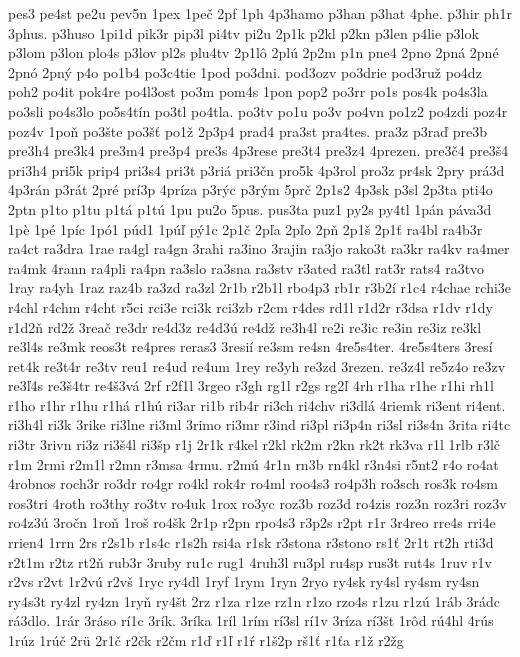 {pes3
pe4st
pe2u
pev5n
1pex
1peč
2pf
1ph
4p3hamo
p3han
p3hat
4phe.
p3hir
ph1r
3phus.
p3huso
1pi1d
pik3r
pip3l
pi4tv
pi2u
2p1k
p2kl
p2kn
p3len
p4lie
p3lok
p3lom
p3lon
plo4s
p3lov
pl2s
plu4tv
2p1lô
2plú
2p2m
p1n
pne4
2pno
2pná
2pné
2pnó
2pný
p4o
po1b4
po3c4tie
1pod
po3dni.
pod3ozv
po3drie
pod3ruž
po4dz
poh2
po4it
pok4re
po4l3ost
po3m
pom4s
1pon
pop2
po3rr
po1s
pos4k
po4s3la
po3sli
po4s3lo
po5s4tín
po3tl
po4tla.
po3tv
po1u
po3v
po4vn
po1z2
po4zdi
poz4r
poz4v
1poň
po3šte
po3šť
po1ž
2p3p4
prad4
pra3st
pra4tes.
pra3z
p3raď
pre3b
pre3h4
pre3k4
pre3m4
pre3p4
pre3s
4p3rese
pre3t4
pre3z4
4prezen.
pre3č4
pre3š4
pri3h4
pri5k
prip4
pri3s4
pri3t
p3riá
pri3čn
pro5k
4p3rol
pro3z
pr4sk
2pry
prá3d
4p3rán
p3rát
2pré
prí3p
4príza
p3rýc
p3rým
5prč
2p1s2
4p3sk
p3sl
2p3ta
pti4o
2ptn
p1to
p1tu
p1tá
p1tú
1pu
pu2o
5pus.
pus3ta
puz1
py2s
py4tl
1pán
páva3d
1pè
1pé
1píc
1pó1
púd1
1púľ
pý1c
2p1č
2pľa
2pľo
2pň
2p1š
2p1ť
ra4bl
ra4b3r
ra4ct
ra3dra
1rae
ra4gl
ra4gn
3rahi
ra3ino
3rajin
ra3jo
rako3t
ra3kr
ra4kv
ra4mer
ra4mk
4rann
ra4pli
ra4pn
ra3slo
ra3sna
ra3stv
r3ated
ra3tl
rat3r
rats4
ra3tvo
1ray
ra4yh
1raz
raz4b
ra3zd
ra3zl
2r1b
r2b1l
rbo4p3
rb1r
r3b2í
r1c4
r4chae
rchi3e
r4chl
r4chm
r4cht
r5ci
rci3e
rci3k
rci3zb
r2cm
r4des
rd1l
r1d2r
r3dsa
r1dv
r1dy
r1d2ň
rd2ž
3reač
re3dr
re4d3z
re4d3ú
re4dž
re3h4l
re2i
re3ic
re3in
re3iz
re3kl
re3l4s
re3mk
reos3t
re4pres
reras3
3resií
re3sm
re4sn
4re5s4ter.
4re5s4ters
3resí
ret4k
re3t4r
re3tv
reu1
re4ud
re4um
1rey
re3yh
re3zd
3rezen.
re3z4l
re5z4o
re3zv
re3ľ4s
re3š4tr
re4š3vá
2rf
r2f1l
3rgeo
r3gh
rg1l
r2gs
rg2ľ
4rh
r1ha
r1he
r1hi
rh1l
r1ho
r1hr
r1hu
r1há
r1hú
ri3ar
ri1b
rib4r
ri3ch
ri4chv
ri3dlá
4riemk
ri3ent
ri4ent.
ri3h4l
ri3k
3rike
ri3lne
ri3ml
3rimo
ri3mr
r3ind
ri3pl
ri3p4n
ri3sl
ri3s4n
3rita
ri4tc
ri3tr
3rivn
ri3z
ri3š4l
ri3šp
r1j
2r1k
r4kel
r2kl
rk2m
r2kn
rk2t
rk3va
r1l
1rlb
r3lč
r1m
2rmi
r2m1l
r2mn
r3msa
4rmu.
r2mú
4r1n
rn3b
rn4kl
r3n4si
r5nt2
r4o
ro4at
4robnos
roch3r
ro3dr
ro4gr
ro4kl
rok4r
ro4ml
roo4s3
ro4p3h
ro3sch
ros3k
ro4sm
ros3tri
4roth
ro3thy
ro3tv
ro4uk
1rox
ro3yc
roz3b
roz3d
ro4zis
roz3n
roz3ri
roz3v
ro4z3ú
3ročn
1roň
1roš
ro4šk
2r1p
r2pn
rpo4s3
r3p2s
r2pt
r1r
3r4reo
rre4s
rri4e
rrien4
1rrn
2rs
r2s1b
r1s4c
r1s2h
rsi4a
r1sk
r3stona
r3stono
rs1ť
2r1t
rt2h
rti3d
r2t1m
r2tz
rt2ň
rub3r
3ruby
ru1c
rug1
4ruh3l
ru3pl
ru4sp
rus3t
rut4s
1ruv
r1v
r2vs
r2vt
1r2vú
r2vš
1ryc
ry4dl
1ryf
1rym
1ryn
2ryo
ry4sk
ry4sl
ry4sm
ry4sn
ry4s3t
ry4zl
ry4zn
1ryň
ry4št
2rz
r1za
r1ze
rz1n
r1zo
rzo4s
r1zu
r1zú
1ráb
3rádc
rá3dlo.
1rár
3ráso
rí1c
3rík.
3ríka
1ríl
1rím
rí3sl
rí1v
3ríza
rí3št
1rôd
rú4hl
4rús
1rúz
1rúč
2rü
2r1č
r2čk
r2čm
r1ď
r1ľ
r1ŕ
r1š2p
rš1ť
r1ťa
r1ž
r2žg
}
